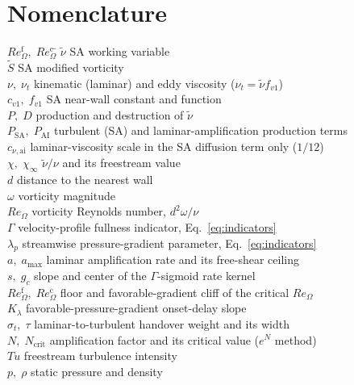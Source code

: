 \documentclass[journal]{new-aiaa}
\begin{document}
\section*{Nomenclature}
\begin{tabbing}
  $Re_\Omega^{\mathrm{f}},\;Re_\Omega^{\mathrm{c}}$\quad\quad \= \kill
  $\tilde\nu$ \> SA working variable \\
  $\tilde S$ \> SA modified vorticity \\
  $\nu,\;\nu_t$ \> kinematic (laminar) and eddy viscosity ($\nu_t=\tilde\nu f_{v1}$) \\
  $c_{v1},\;f_{v1}$ \> SA near-wall constant and function \\
  $P,\;D$ \> production and destruction of $\tilde\nu$ \\
  $P_\mathrm{SA},\;P_\mathrm{AI}$ \> turbulent (SA) and laminar-amplification production terms \\
  $c_{\nu,\mathrm{ai}}$ \> laminar-viscosity scale in the SA diffusion term only ($1/12$) \\
  $\chi,\;\chi_\infty$ \> $\tilde\nu/\nu$ and its freestream value \\
  $d$ \> distance to the nearest wall \\
  $\omega$ \> vorticity magnitude \\
  $Re_\Omega$ \> vorticity Reynolds number, $d^2\omega/\nu$ \\
  $\Gamma$ \> velocity-profile fullness indicator, Eq.~\eqref{eq:indicators} \\
  $\lambda_p$ \> streamwise pressure-gradient parameter, Eq.~\eqref{eq:indicators} \\
  $a,\;a_{\max}$ \> laminar amplification rate and its free-shear ceiling \\
  $s,\;g_c$ \> slope and center of the $\Gamma$-sigmoid rate kernel \\
  $Re_\Omega^{\mathrm{f}},\;Re_\Omega^{\mathrm{c}}$ \> floor and favorable-gradient cliff of the critical $Re_\Omega$ \\
  $K_\lambda$ \> favorable-pressure-gradient onset-delay slope \\
  $\sigma_t,\;\tau$ \> laminar-to-turbulent handover weight and its width \\
  $N,\;N_\mathrm{crit}$ \> amplification factor and its critical value ($e^N$ method) \\
  $Tu$ \> freestream turbulence intensity \\
  $p,\;\rho$ \> static pressure and density \\

\end{tabbing}
\end{document}
